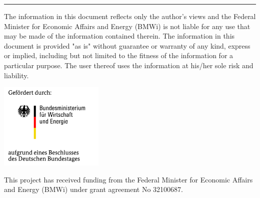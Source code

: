 \vspace{5ex}
%

\vspace{1ex}

\rule{16cm}{1pt}

{\scriptsize
\noindent
The information in this document reflects only the author's views and the Federal Minister for Economic Affairs and Energy (BMWi) is not liable for any use that may be made of the information contained therein. The information in this document is provided "as is" without guarantee or warranty of any kind, express or implied, including but not limited to the fitness of the information for a particular purpose. The user thereof uses the information at his/her sole risk and liability.}
\begin{center}
\includegraphics[width=5cm]{logo/BMWi_logo_de.jpg}
\end{center}

\begin{center}
{\footnotesize
This project has received funding from the Federal Minister for Economic Affairs and Energy (BMWi) under grant agreement No  32100687.}
\end{center}
